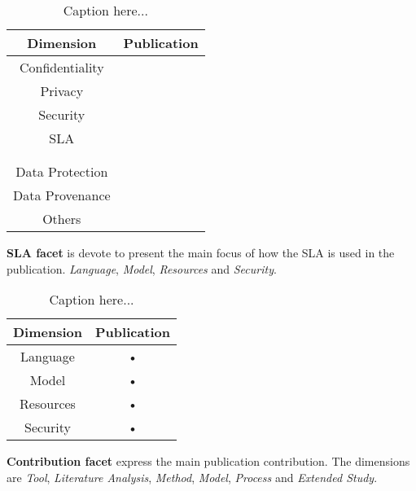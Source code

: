 \begin{description}
\begin{table}[h]
\caption{Caption here...}
\begin{center}
\begin{tabular}{|c|c|}
\hline 
\textbf{Dimension} & \textbf{Publication} \\ 
\hline 
Confidentiality & \cite{024,104,109,111} \\ 
\hline 
Privacy & \cite{007,024,047,067,068,095,096,109,111,113} \\ 
\hline 
Security & \cite{065,081,093,109,112,113} \\ 
\hline 
SLA  & \cite{001,002,007,008,009,011,012,013,014,015,016,017,018,019,020,021,022,023,024,025,026} \\ 
     & \cite{027,028,029,030,031,032,033,034,035,036,037,038,039,040,041,042,043,044,045,046,047} \\
     & \cite{048,049,050,051,052,053,054,055,056,057,058,059,060,061,062,063,064,065} \\
\hline 
Data Protection & \cite{047,104,106} \\ 
\hline 
Data Provenance & \cite{012} \\ 
\hline 
Others & \cite{071,093,100} \\ 
\hline 
\end{tabular}
\end{center}
\end{table}
\item \textbf{SLA facet} is devote to present the main focus of how the SLA is used in the publication.  \textit{Language}, \textit{Model}, \textit{Resources} and \textit{Security}.
\begin{table}[h]
\caption{Caption here...}
\begin{center}
\begin{tabular}{|c|c|}
\hline 
\textbf{Dimension} & \textbf{Publication} \\ 
\hline 
Language & • \\ 
\hline 
Model & • \\ 
\hline 
Resources & • \\ 
\hline 
Security & • \\ 
\hline 
\end{tabular}
\end{center}
\end{table}
\item \textbf{Contribution facet} express the main publication contribution. 
The dimensions are \textit{Tool}, \textit{Literature Analysis}, \textit{Method}, \textit{Model}, \textit{Process} and \textit{Extended Study}.

\end{description}
